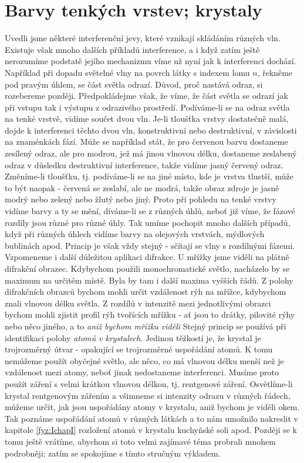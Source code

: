   \section{Barvy tenkých vrstev; krystaly}\label{fyz:IchapXXXsecV}
    Uvedli jsme některé interferenční jevy, které vznikají skládáním různých vln. Existuje však 
    mnoho dalších příkladů interference, a i když zatím ještě nerozumíme podstatě jejího mechanizmu 
    víme už nyní jak k interferenci dochází. Například při dopadu světelné vlny na povrch látky s 
    indexem lomu \(n\), řekněme pod pravým úhlem, se část světla odrazí. Důvod, proč nastává odraz, 
    si rozebereme později. Předpokládejme však, že víme, že část světla se odrazí jak při vstupu 
    tak i výstupu z odrazivého prostředí. Podíváme-li se na odraz světla na tenké vrstvě, vidíme 
    součet dvou vln. Je-li tloušťka vrstvy dostatečně malá, dojde k interferenci těchto dvou vln, 
    konstruktivní nebo destruktivní, v závislosti na znaménkách fází. Může se například stát, že 
    pro červenou barvu dostaneme zesílený odraz, ale pro modrou, jež má jinou vlnovou délku, 
    dostaneme zeslabený odraz v důsledku destruktivní interference, takže vidíme jasný červený 
    odraz. Změníme-li tloušťku, tj. podíváme-li se na jiné místo, kde je vrstva tlustší, může to 
    být naopak - červená se zeslabí, ale ne modrá, takže obraz zdroje je jasně modrý nebo     
    zelený nebo žlutý nebo jiný. Proto při pohledu na tenké vrstvy vidíme barvy a ty se mění, 
    díváme-li se z různých úhlů, neboť již víme, že fázové rozdíly jsou různé pro různé úhly. Tak 
    umíme pochopit mnoho dalších případů, když při různých úhlech vidíme barvy na olejových 
    vrstvách, mýdlových bublinách apod. Princip je však vždy stejný - sčítají se vlny s rozdílnými 
    fázemi. Vzpomeneme i další důležitou aplikaci difrakce. U mřížky jsme viděli na plátně 
    difrakční obrazec. Kdybychom použili monochromatické světlo, nacházelo by se maximum na určitém 
    místě. Byla by tam i další maxima vyšších řádů. Z polohy difrakčních obrazců bychom mohli určit 
    vzdálenost rýh na mřížce, kdybychom znali vlnovou délku světla. Z rozdílů v intenzitě mezi 
    jednotlivými obrazci bychom mohli zjistit profil rýh tvořících mřížku - ať jsou to drátky, 
    pilovité rýhy nebo něco jiného, a to \emph{aniž bychom mřížku viděli} Stejný princip se používá 
    při identifikaci polohy \emph{atomů v krystalech}. Jedinou těžkostí je, že krystal je 
    trojrozměrný útvar - opakující se trojrozměrné uspořádání atomů. K tomu nemůžeme použít 
    obyčejné světlo, ale něco, co má vlnovou délku menší než je vzdálenost mezi atomy, neboť jinak 
    nedostaneme interferenci. Musíme proto použít záření s velmi krátkou vlnovou délkou, tj. 
    rentgenové záření. Osvětlíme-li krystal rentgenovým zářením a všimneme si intenzity odrazu v 
    různých řádech, můžeme určit, jak jsou uspořádány atomy v krystalu, aniž bychom je viděli okem. 
    Tak poznáme uspořádání atomů v různých látkách a to nám umožnilo nakreslit v kapitole 
    \ref{fyz:IchapI} rozložení atomů v krystalu kuchyňské soli apod. Později se k tomu ještě 
    vrátíme, abychom si toto velmi zajímavé téma probrali mnohem podrobněji; zatím se spokojíme s 
    tímto stručným výkladem.
  
